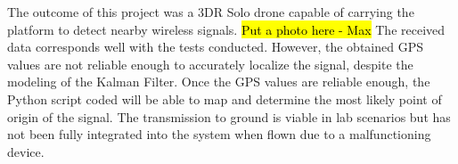 The outcome of this project was a 3DR Solo drone capable of carrying the platform to detect nearby wireless signals. \hl{Put a photo here - Max} The received data corresponds well with the tests conducted. However, the obtained GPS values are not reliable enough to accurately localize the signal, despite the modeling of the Kalman Filter. Once the GPS values are reliable enough, the Python script coded will be able to map and determine the most likely point of origin of the signal. The transmission to ground is viable in lab scenarios but has not been fully integrated into the system when flown due to a malfunctioning device. \par
